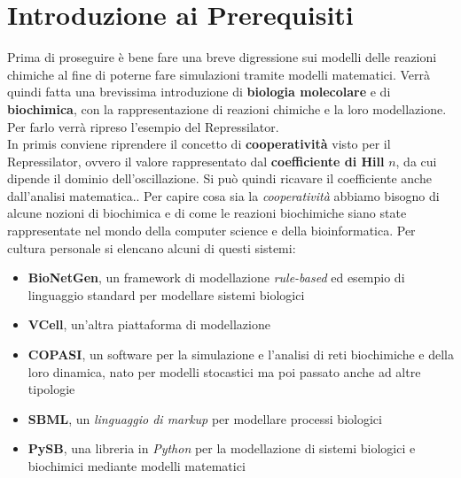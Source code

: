 \documentclass[a4paper,12pt, oneside]{book}
\begin{document}
\chapter{Introduzione ai Prerequisiti}
Prima di proseguire è bene fare una breve digressione sui modelli delle reazioni
chimiche al fine di poterne fare simulazioni tramite modelli matematici. Verrà
quindi fatta una brevissima introduzione di \textbf{biologia molecolare} e di
\textbf{biochimica}, con la rappresentazione di reazioni chimiche e la loro
modellazione. Per farlo verrà ripreso l'esempio del Repressilator.\\ 
In primis conviene riprendere il concetto di \textbf{cooperatività} visto per il
Repressilator, ovvero il valore rappresentato dal \textbf{coefficiente di Hill}
$n$, da cui dipende il dominio dell'oscillazione. Si può quindi ricavare il
coefficiente anche
dall'analisi matematica.. Per capire cosa sia la
\textit{cooperatività} abbiamo bisogno di alcune nozioni di biochimica e di come
le reazioni biochimiche siano state rappresentate nel mondo della computer
science e della bioinformatica. Per cultura personale si elencano alcuni di
questi sistemi:
\begin{itemize}
  \item \textbf{BioNetGen}, un framework di modellazione \textit{rule-based} ed
  esempio di linguaggio standard per modellare sistemi biologici
  \item \textbf{VCell}, un'altra piattaforma di modellazione
  \item \textbf{COPASI}, un software per la simulazione e l'analisi di reti
  biochimiche e della loro dinamica, nato per modelli stocastici ma poi passato
  anche ad altre tipologie
  \item \textbf{SBML}, un \textit{linguaggio di markup} per modellare processi
  biologici 
  \item \textbf{PySB}, una libreria in \textit{Python} per la modellazione di
  sistemi biologici e biochimici mediante modelli matematici
\end{itemize}
\end{document}
